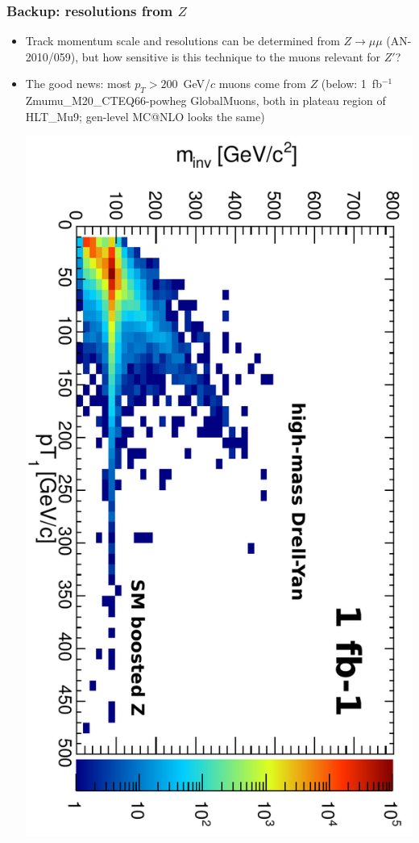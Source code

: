 \documentclass[compress]{beamer}
\begin{document}
\begin{frame}
\frametitle{Backup: resolutions from $Z$}
\begin{itemize}
\item Track momentum scale and resolutions can be determined from
  $Z\to\mu\mu$ (AN-2010/059), but how sensitive is this technique to
  the muons relevant for $Z'$?

\item The good news: most $p_T > 200$~GeV/$c$ muons come from
  $Z$ (below: 1~fb$^{-1}$ Zmumu\_M20\_CTEQ66-powheg GlobalMuons, both in plateau region of HLT\_Mu9; gen-level MC@NLO looks the same)

\includegraphics[height=0.9\linewidth, angle=90]{mass_vs_ptone_200.pdf}
\end{itemize}
\end{frame}
\end{document}
